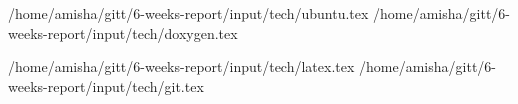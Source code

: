 
 {/home/amisha/gitt/6-weeks-report/input/tech/ubuntu.tex}
 {/home/amisha/gitt/6-weeks-report/input/tech/doxygen.tex}

 {/home/amisha/gitt/6-weeks-report/input/tech/latex.tex}
 {/home/amisha/gitt/6-weeks-report/input/tech/git.tex}




